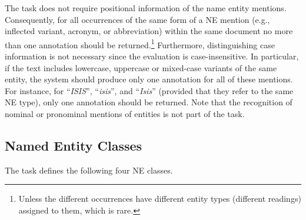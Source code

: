 \documentclass[11pt]{article}
\begin{document}
\noindent The task does not require positional information of the name entity mentions.
Consequently, for all occurrences of the same form of a NE mention (e.g., inflected variant,
acronym, or abbreviation) within the same document no more than one annotation should be
returned.\footnote{Unless the different occurrences have different entity types (different
  readings) assigned to them, which is rare.}  Furthermore, distinguishing case information is
not necessary since the evaluation is case-insensitive.  In particular, if the text includes
lowercase, uppercase or mixed-case variants of the same entity, the system should produce only
one annotation for all of these mentions.  For instance, for ``\textit{ISIS}'',
``\textit{isis}'', and ``\textit{Isis}'' (provided that they refer to the same NE type), only
one annotation should be returned.  Note that the recognition of nominal or pronominal
mentions of entities is not part of the task.

\subsection{Named Entity Classes}

The task defines the following four NE classes.
\end{document}

